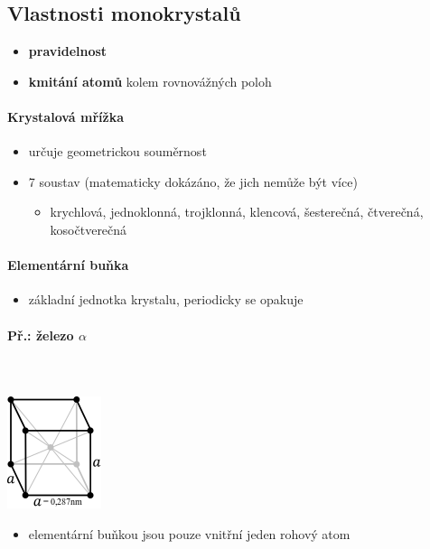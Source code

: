 \subsection{Vlastnosti monokrystalů}
\begin{itemize}
\item \textbf{pravidelnost}
\item \textbf{kmitání atomů} kolem rovnovážných poloh
\end{itemize}

\paragraph{Krystalová mřížka}
\begin{itemize}
\item určuje geometrickou souměrnost
\item 7 soustav (matematicky dokázáno, že jich nemůže být více)
\begin{itemize}
	\item krychlová, jednoklonná, trojklonná, klencová, šesterečná, čtverečná, kosočtverečná
\end{itemize}
\end{itemize}

\paragraph{Elementární buňka}
\begin{itemize}
\item základní jednotka krystalu, periodicky se opakuje
\end{itemize}

\paragraph{Př.: železo $\alpha$}\mbox{}\\ \mbox{} \\
\includegraphics[scale=0.5]{pictures/001.png}
\begin{itemize}
\item elementární buňkou jsou pouze vnitřní jeden rohový atom
\end{itemize}

